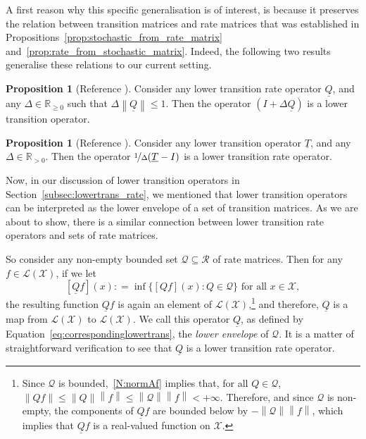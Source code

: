 \documentclass[10pt,a4paper]{paper}
\theoremstyle{definition}
\newtheorem{proposition}[theorem]{Proposition}
\newcommand{\reals}{\mathbb{R}}
\newcommand{\realspos}{\reals_{>0}}
\newcommand{\realsnonneg}{\reals_{\geq 0}}
\newcommand{\states}{\mathcal{X}}
\newcommand{\lt}{\underline{T}}
\newcommand{\gambles}{\mathcal{L}}
\newcommand{\gamblesX}{\gambles(\states)}
\newcommand{\rateset}{\mathcal{Q}}
\newcommand{\lrate}{\underline{Q}}
\newcommand{\norm}[1]{\left\lVert #1 \right\rVert}
\newcommand{\coloneqq}{:\!=}
\begin{document}
A first reason why this specific generalisation is of interest, is because it preserves the relation between transition matrices and rate matrices that was established in Propositions~\ref{prop:stochastic_from_rate_matrix} and~\ref{prop:rate_from_stochastic_matrix}. Indeed, the following two results generalise these relations to our current setting.


\begin{proposition}[Reference {\cite[Proposition 5]{DeBock:2016}}]\label{lemma:normQsmallenough}
Consider any lower transition rate operator $\lrate$, and any $\Delta\in\realsnonneg$ such that $\Delta\norm{\lrate}\leq 1$. Then the operator $(I+\Delta\lrate)$ is a lower transition operator.
\end{proposition}

\begin{proposition}[Reference {\cite[Proposition 6]{DeBock:2016}}]\label{lemma:lower_trans_to_lower_rate}
Consider any lower transition operator $\lt$, and any $\Delta\in\realspos$. Then the operator $\nicefrac{1}{\Delta}(\lt - I)$ is a lower transition rate operator.
\end{proposition}

Now, in our discussion of lower transition operators in Section~\ref{subsec:lowertrans_rate}, we mentioned that lower transition operators can be interpreted as the lower envelope of a set of transition matrices. As we are about to show, there is a similar connection between lower transition rate operators and sets of rate matrices.

So consider any non-empty bounded set $\rateset\subseteq\mathcal{R}$ of rate matrices. Then for any $f\in\gamblesX$, if we let
\begin{equation}\label{eq:correspondinglowertrans}
[\lrate f](x)\coloneqq\inf\{[Qf](x)\colon Q\in\rateset\}
\text{ for all $x\in\states$},%
\end{equation}
the resulting function $\lrate f$ is again an element of $\gamblesX$,\footnote{Since $\rateset$ is bounded,~\ref{N:normAf} implies that, for all $Q\in\rateset$, $\norm{Qf}\leq\norm{Q}\norm{f}\leq\norm{\rateset}\norm{f}<+\infty$. Therefore, and since $\rateset$ is non-empty, the components of $\lrate f$ are bounded below by $-\norm{\rateset}\norm{f}$, which implies that $\lrate f$ is a real-valued function on $\states$.}
and therefore, $\lrate$ is a map from $\gamblesX$ to $\gamblesX$. We call this operator $\lrate$, as defined by Equation~\eqref{eq:correspondinglowertrans}, the \emph{lower envelope} of $\rateset$. It is a matter of straightforward verification to see that $\lrate$ is a lower transition rate operator.
\end{document}

